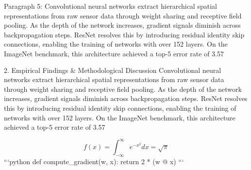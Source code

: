 Paragraph 5: Convolutional neural networks extract hierarchical spatial representations from raw sensor data through weight sharing and receptive field pooling. As the depth of the network increases, gradient signals diminish across backpropagation steps. ResNet resolves this by introducing residual identity skip connections, enabling the training of networks with over 152 layers. On the ImageNet benchmark, this architecture achieved a top-5 error rate of 3.57%


2. Empirical Findings & Methodological Discussion
Convolutional neural networks extract hierarchical spatial representations from raw sensor data through weight sharing and receptive field pooling. As the depth of the network increases, gradient signals diminish across backpropagation steps. ResNet resolves this by introducing residual identity skip connections, enabling the training of networks with over 152 layers. On the ImageNet benchmark, this architecture achieved a top-5 error rate of 3.57%

$$ f(x) = \int_{-\infty}^{\infty} e^{-x^2} dx = \sqrt{\pi} $$ 
```python
def compute_gradient(w, x):
    return 2 * (w @ x)
```